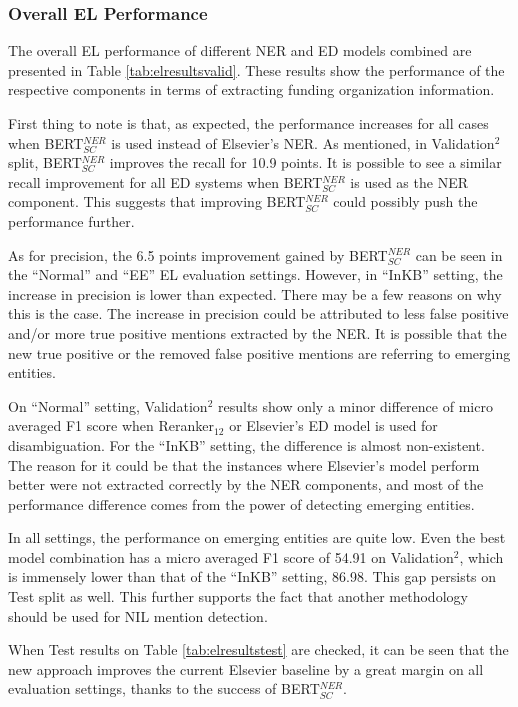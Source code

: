 \documentclass{report}
\theoremstyle{definition}
\theoremstyle{remark}
\begin{document}
\subsubsection{Overall EL Performance}
The overall EL performance of different NER and ED models combined are presented in Table \ref{tab:elresultsvalid}. These results show the performance of the respective components in terms of extracting funding organization information.

First thing to note is that, as expected, the performance increases for all cases when BERT$_{SC}^{NER}$ is used instead of Elsevier's NER. As mentioned, in Validation$^2$ split, BERT$_{SC}^{NER}$ improves the recall for 10.9 points. It is possible to see a similar recall improvement for all ED systems when BERT$_{SC}^{NER}$ is used as the NER component. This suggests that improving BERT$_{SC}^{NER}$ could possibly push the performance further. 

As for precision, the 6.5 points improvement gained by BERT$_{SC}^{NER}$ can be seen in the ``Normal'' and ``EE'' EL evaluation settings. However, in ``InKB'' setting, the increase in precision is lower than expected. There may be a few reasons on why this is the case. The increase in precision could be attributed to less false positive and/or more true positive mentions extracted by the NER. It is possible that the new true positive or the removed false positive mentions are referring to emerging entities.

On ``Normal'' setting, Validation$^2$ results show only a minor difference of micro averaged F1 score when Reranker$_{12}$ or Elsevier's ED model is used for disambiguation. For the ``InKB'' setting, the difference is almost non-existent.  The reason for it could be that the instances where Elsevier's model perform better were not extracted correctly by the NER components, and most of the performance difference comes from the power of detecting emerging entities.

In all settings, the performance on emerging entities are quite low. Even the best model combination has a micro averaged F1 score of 54.91 on Validation$^2$, which is immensely lower than that of the ``InKB'' setting, 86.98. This gap persists on Test split as well. This further supports the fact that another methodology should be used for NIL mention detection.

When Test results on Table \ref{tab:elresultstest} are checked, it can be seen that the new approach improves the current Elsevier baseline by a great margin on all evaluation settings, thanks to the success of BERT$^{NER}_{SC}$. 
\end{document}
